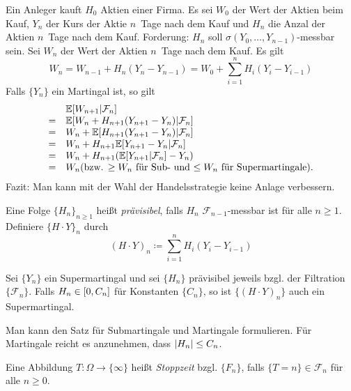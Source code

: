 \documentclass{cheat-sheet}
\newcommand{\E}{\mathbb{E}} %
\newcommand{\Filt}{\mathcal{F}} %
\begin{document}
\begin{bsp}
  Ein Anleger kauft $H_0$ Aktien einer Firma.
  Es sei $W_0$ der Wert der Aktien beim Kauf,
  $Y_n$ der Kurs der Aktie $n$~Tage nach dem Kauf und
  $H_n$ die Anzal der Aktien $n$~Tage nach dem Kauf.
  Forderung: $H_n$ soll $\sigma(Y_0, \ldots, Y_{n-1})$-messbar sein.
  Sei $W_n$ der Wert der Aktien $n$~Tage nach dem Kauf.
  Es gilt
  \[ W_n = W_{n-1} + H_n (Y_n - Y_{n-1}) = W_0 + \sum_{i=1}^n H_i (Y_i - Y_{i-1}) \]
  Falls $\{ Y_n \}$ ein Martingal ist, so gilt
  \[
    \begin{array}{c l}
      & \E[ W_{n+1} | \Filt_n ] \\
      = & \E[ W_n + H_{n+1} (Y_{n+1} - Y_n) | \Filt_n ] \\
      = & W_n + \E[ H_{n+1} (Y_{n+1} - Y_n) | \Filt_n ] \\
      = & W_n + H_{n+1} \E[ Y_{n+1} - Y_n | \Filt_n ] \\
      = & W_n + H_{n+1} (\E[ Y_{n+1} | \Filt_n ] - Y_n) \\
      = & W_n (\text{bzw. $\geq W_n$ für Sub- und $\leq W_n$ für Supermartingale}).
    \end{array}
  \]
  Fazit: Man kann mit der Wahl der Handelsstrategie keine Anlage verbessern.
\end{bsp}

\begin{defn}
  Eine Folge $\{ H_n \}_{n \geq 1}$ heißt \emph{prävisibel}, falls $H_n$ $\Filt_{n-1}$-messbar ist für alle $n \geq 1$.
  Definiere $\{ H \cdot Y \}_n$ durch
  \[
    (H \cdot Y)_n \coloneqq \sum_{i=1}^n H_i (Y_i - Y_{i-1})
  \]
\end{defn}

\begin{satz}
  Sei $\{ Y_n \}$ ein Supermartingal und sei $\{ H_n \}$ prävisibel jeweils bzgl. der Filtration $\{ \Filt_n \}$.
  Falls $H_n \in \left[ 0, C_n \right]$ für Konstanten $\{ C_n \}$, so ist $\{ (H \cdot Y)_n \}$ auch ein Supermartingal.
\end{satz}

\begin{bem}
  Man kann den Satz für Submartingale und Martingale formulieren.
  Für Martingale reicht es anzunehmen, dass $\lvert H_n\rvert \leq C_n$.
\end{bem}

\begin{defn}
  Eine Abbildung $T : \Omega \to \{ \infty \}$ heißt \emph{Stoppzeit} bzgl. $\{ F_n \}$, falls $\{ T=n \} \in \Filt_n$ für alle $n \geq 0$.
\end{defn}
\end{document}
